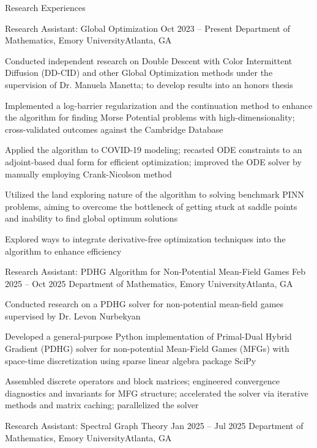 \documentclass[10pt, letterpaper]{resume} %
\begin{document}
\begin{rSection}{Research Experiences}
\begin{rSubsection}
	{Research Assistant: Global Optimization}
	{Oct 2023 -- Present}
	{Department of Mathematics, Emory University}{Atlanta, GA}
	
	\item Conducted independent research on Double Descent with Color Intermittent Diffusion (DD-CID) and other Global Optimization methods under the supervision of Dr. Manuela Manetta; to develop results into an honors thesis
	\item Implemented a log-barrier regularization and the continuation method to enhance the algorithm for finding Morse Potential problems with high-dimensionality; cross-validated outcomes against the Cambridge Database
	\item Applied the algorithm to COVID-19 modeling; recasted ODE constraints to an adjoint-based dual form for efficient optimization; improved the ODE solver by manually employing Crank-Nicolson method
	\item Utilized the land exploring nature of the algorithm to solving benchmark PINN problems, aiming to overcome the bottleneck of getting stuck at saddle points and inability to find global optimum solutions
	\item Explored ways to integrate derivative-free optimization techniques into the algorithm to enhance efficiency
\end{rSubsection}

\begin{rSubsection}
	{Research Assistant: PDHG Algorithm for Non-Potential Mean-Field Games}
	{Feb 2025 -- Oct 2025}
	{Department of Mathematics, Emory University}{Atlanta, GA}
	
	\item Conducted research on a PDHG solver for non-potential mean-field games supervised by Dr. Levon Nurbekyan
	\item Developed a general-purpose Python implementation of Primal-Dual Hybrid Gradient (PDHG) solver for non-potential Mean-Field Games (MFGs) with space-time discretization using sparse linear algebra package SciPy
	\item Assembled discrete operators and block matrices; engineered convergence diagnostics and invariants for MFG structure; accelerated the solver via iterative methods and matrix caching; parallelized the solver
\end{rSubsection}

\begin{rSubsection}
	{Research Assistant: Spectral Graph Theory}
	{Jan 2025 -- Jul 2025}
	{Department of Mathematics, Emory University}{Atlanta, GA}
	

\end{rSubsection}
\end{rSection}
\end{document}
